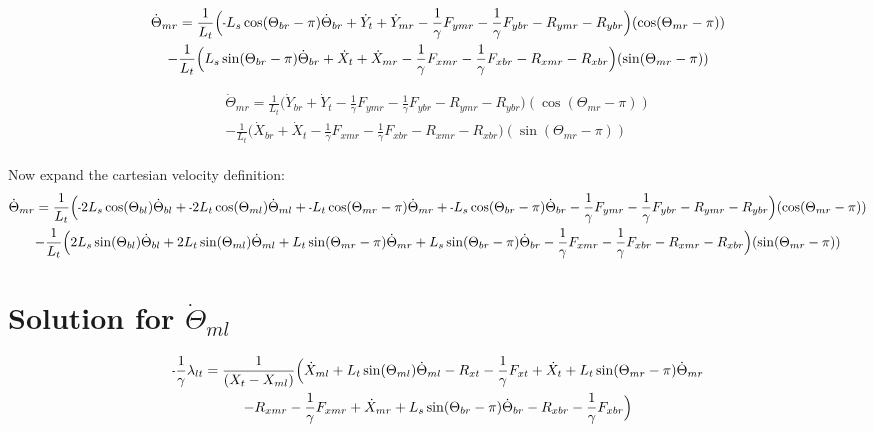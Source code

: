 \documentclass[11pt, landscape]{article}
\newcommand{\mn}{\scalebox{0.7}[1.0]{-}}
\begin{document}
\begin{multline}
\dot{\Theta}_{mr} =
\frac{1}{L_{t}} \Big( \mn L_{s}\cos(\Theta_{br}-\pi) \dot{\Theta}_{br} + \dot{Y}_{t }  + \dot{Y}_{mr} - \frac{1}{\gamma}F_{ymr} - \frac{1}{\gamma}F_{ybr} - R_{ymr} - R_{ybr} \Big)(\cos(\Theta_{mr}-\pi))\\
  - \frac{1}{L_{t}}\Big(L_{s}\sin(\Theta_{br}-\pi) \dot{\Theta}_{br} + \dot{X}_{t } + \dot{X}_{mr} - \frac{1}{\gamma}F_{xmr} - \frac{1}{\gamma}F_{xbr} - R_{xmr} - R_{xbr} \Big)(\sin(\Theta_{mr}-\pi))
\end{multline}

\begin{multline}
\dot{\Theta}_{mr} =
\frac{1}{L_{t}} \Big(\dot{Y}_{br} + \dot{Y}_{t } - \frac{1}{\gamma}F_{ymr} - \frac{1}{\gamma}F_{ybr} - R_{ymr} - R_{ybr} \Big)(\cos(\Theta_{mr}-\pi))\\
  - \frac{1}{L_{t}}\Big(\dot{X}_{br} + \dot{X}_{t } - \frac{1}{\gamma}F_{xmr} - \frac{1}{\gamma}F_{xbr} - R_{xmr} - R_{xbr} \Big)(\sin(\Theta_{mr}-\pi))
\end{multline}
\\
Now expand the cartesian velocity definition: \\

\begin{multline}
\dot{\Theta}_{mr} =
\frac{1}{L_{t}} \Big(\mn 2L_{s}\cos(\Theta_{bl})\dot{\Theta}_{bl} + \mn 2L_{t}\cos(\Theta_{ml})\dot{\Theta}_{ml} + \mn L_{t}\cos(\Theta_{mr}-\pi)\dot{\Theta}_{mr} + \mn L_{s}\cos(\Theta_{br}-\pi)\dot{\Theta}_{br}
  - \frac{1}{\gamma}F_{ymr} - \frac{1}{\gamma}F_{ybr} - R_{ymr} - R_{ybr} \Big)(\cos(\Theta_{mr}-\pi))\\
  - \frac{1}{L_{t}}\Big(2L_{s}\sin(\Theta_{bl})\dot{\Theta}_{bl} + 2L_{t}\sin(\Theta_{ml})\dot{\Theta}_{ml} + L_{t}\sin(\Theta_{mr}-\pi)\dot{\Theta}_{mr} + L_{s}\sin(\Theta_{br}-\pi)\dot{\Theta}_{br}
   - \frac{1}{\gamma}F_{xmr} - \frac{1}{\gamma}F_{xbr} - R_{xmr} - R_{xbr} \Big)(\sin(\Theta_{mr}-\pi))
\end{multline}


\section{Solution for $\dot{\Theta}_{ml}$}

\begin{multline}
\mn\frac{1}{\gamma}\lambda_{lt} =
\frac{1}{(X_{t } - X_{ml})} \Big( \dot{X}_{ml} + L_{t}\sin(\Theta_{ml})      \dot{\Theta}_{ml} - R_{xt } - \frac{1}{\gamma}F_{xt } + \dot{X}_{t } + L_{t}\sin(\Theta_{mr}-\pi)  \dot{\Theta}_{mr} \\
- R_{xmr} - \frac{1}{\gamma}F_{xmr} + \dot{X}_{mr} + L_{s}\sin(\Theta_{br}-\pi)  \dot{\Theta}_{br} - R_{xbr} - \frac{1}{\gamma}F_{xbr} \Big)
\end{multline}
\end{document}

